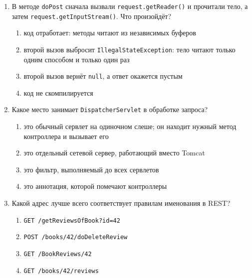 \begin{enumerate}
\item В методе \texttt{doPost} сначала вызвали \texttt{request.getReader()} и
      прочитали тело, а затем \texttt{request.getInputStream()}. Что
      произойдёт?
  \begin{enumerate}
    \item[а)] код отработает: методы читают из независимых буферов
    \item[б)] второй вызов выбросит \texttt{IllegalStateException}: тело читают
          только одним способом и только один раз
    \item[в)] второй вызов вернёт \texttt{null}, а ответ окажется пустым
    \item[г)] код не скомпилируется
  \end{enumerate}

\item Какое место занимает \texttt{DispatcherServlet} в обработке запроса?
  \begin{enumerate}
    \item[а)] это обычный сервлет на одиночном слеше; он находит нужный метод
          контроллера и вызывает его
    \item[б)] это отдельный сетевой сервер, работающий вместо Tomcat
    \item[в)] это фильтр, выполняемый до всех сервлетов
    \item[г)] это аннотация, которой помечают контроллеры
  \end{enumerate}

\item Какой адрес лучше всего соответствует правилам именования в REST?
  \begin{enumerate}
    \item[а)] \texttt{GET /getReviewsOfBook?id=42}
    \item[б)] \texttt{POST /books/42/doDeleteReview}
    \item[в)] \texttt{GET /BookReviews/42}
    \item[г)] \texttt{GET /books/42/reviews}
  \end{enumerate}

\end{enumerate}
